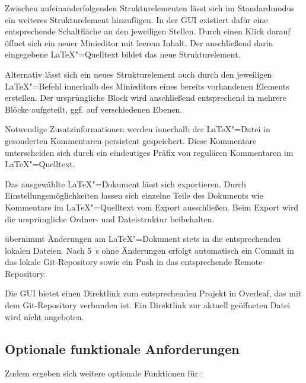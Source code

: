 Zwischen aufeinanderfolgenden Strukturelementen lässt sich im Standardmodus ein weiteres Strukturelement hinzufügen.
In der GUI existiert dafür eine entsprechende Schaltfläche an den jeweiligen Stellen.
Durch einen Klick darauf öffnet sich ein neuer Minieditor mit leerem Inhalt.
Der anschließend darin eingegebene \LaTeX"=Quelltext bildet das neue Strukturelement.

Alternativ lässt sich ein neues Strukturelement auch durch den jeweiligen \LaTeX"=Befehl innerhalb des Minieditors
eines bereits vorhandenen Elements erstellen.
Der ursprüngliche Block wird anschließend entsprechend in mehrere Blöcke aufgeteilt, ggf. auf verschiedenen Ebenen.


Notwendige Zusatzinformationen werden innerhalb der \LaTeX"=Datei in gesonderten Kommentaren persistent gespeichert.
Diese Kommentare unterscheiden sich durch ein eindeutiges Präfix von regulären Kommentaren im \LaTeX"=Quelltext.


Das ausgewählte \LaTeX"=Dokument lässt sich exportieren.
Durch Einstellungsmöglichkeiten lassen sich einzelne Teile des Dokuments wie Kommentare im \LaTeX"=Quelltext vom Export
ausschließen.
Beim Export wird die ursprüngliche Ordner- und Dateistruktur beibehalten.


\texla{} übernimmt Änderungen am \LaTeX"=Dokument stets in die entsprechenden lokalen Dateien.
Nach 5~\si{\second} ohne Änderungen erfolgt automatisch ein Commit in das lokale Git-Repository sowie ein Push in das
entsprechende Remote-Repository.


Die GUI bietet einen Direktlink zum entsprechenden Projekt in Overleaf, das mit dem Git-Repository verbunden ist.
Ein Direktlink zur aktuell geöffneten Datei wird nicht angeboten.

\clearpage

\subsection{Optionale funktionale Anforderungen}
\label{subsec:optionale-funktionale-anforderungen}
Zudem ergeben sich weitere optionale Funktionen für \texla:

